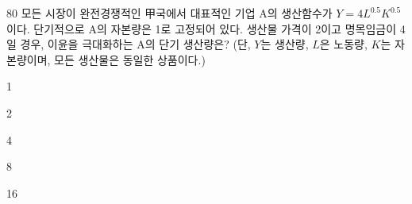 \begin{question}{80}
모든 시장이 완전경쟁적인 甲국에서 대표적인 기업 A의 생산함수가 ${ Y=4L^{ 0.5 } K^{ 0.5 } }$이다. 단기적으로 A의 자본량은 1로 고정되어 있다. 생산물 가격이 2이고 명목임금이 4일 경우, 이윤을 극대화하는 A의 단기 생산량은? (단, ${ Y }$는 생산량, ${ L }$은 노동량, ${ K }$는 자본량이며, 모든 생산물은 동일한 상품이다.)
\begin{choices}
  \item 1
  \item 2
  \item 4
  \item 8
  \item 16
\end{choices}
\end{question}
